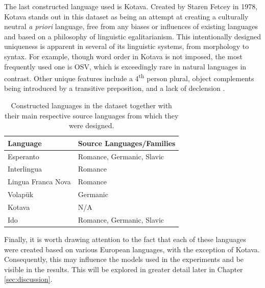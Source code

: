\documentclass[12pt,a4paper]{article}
\numberwithin{figure}{section}
\numberwithin{table}{section}
\numberwithin{definition}{section}
\begin{document}

The last constructed language used is Kotava. Created by Staren Fetcey in 1978, Kotava stands out in this dataset as being an attempt at creating a culturally neutral \textit{a priori} language, free from any biases or influences of existing languages and based on a philosophy of linguistic egalitarianism. This intentionally designed uniqueness is apparent in several of its linguistic systems, from morphology to syntax. For example, though word order in Kotava is not imposed, the most frequently used one is OSV, which is exceedingly rare in natural languages in contrast. Other unique features include a 4\textsuperscript{th} person plural, object complements being introduced by a transitive preposition, and a lack of declension \parencite{Fetcey2013book}. 


\begin{table}[!h]
  \centering
  \renewcommand{\arraystretch}{1.5}
  \begin{tabular} {|p{5cm}|p{5cm}|}
  \hline
  \textbf{Language} & \textbf{Source Languages/Families} \\
  \hline
  Esperanto & Romance, Germanic, Slavic \\
  Interlingua & Romance \\
  Lingua Franca Nova & Romance \\
  Volapük & Germanic \\
  Kotava & N/A \\
  Ido & Romance, Germanic, Slavic \\
  \hline
  \end{tabular}
  \caption{Constructed languages in the dataset together with their main respective source languages from which they were designed.}
  \label{tbl:conlangs}
\end{table}

Finally, it is worth drawing attention to the fact that each of these languages were created based on various European languages, with the exception of Kotava. Consequently, this may influence the models used in the experiments and be visible in the results. This will be explored in greater detail later in Chapter \ref{sec:discussion}.
\end{document}
